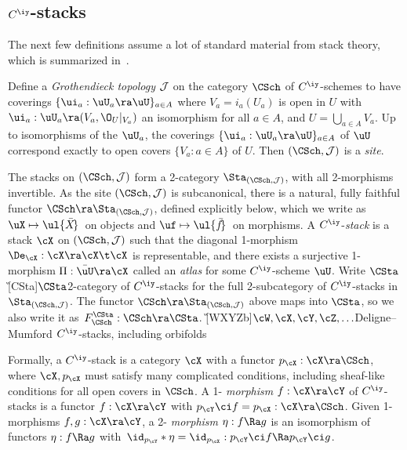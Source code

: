 \documentclass{article}
\begin{document}
\subsection{$C^\iy$-stacks}
\label{ds81}

The next few definitions assume a lot of standard material from
stack theory, which is summarized in~\cite[\S 7]{Joyc4}.

\begin{dfn} Define a {\it Grothendieck topology\/} $\cal J$ on the category $\CSch$ of $C^\iy$-schemes to
have coverings $\{\ui_a:\uU_a\ra\uU\}_{a\in A}$ where $V_a=i_a(U_a)$
is open in $U$ with $\ui_a:\uU_a\ra(V_a,\O_U\vert_{V_a})$ an
isomorphism for all $a\in A$, and $U=\bigcup_{a\in A}V_a$. Up to
isomorphisms of the $\uU_a$, the coverings
$\{\ui_a:\uU_a\ra\uU\}_{a\in A}$ of $\uU$ correspond exactly to open
covers $\{V_a:a\in A\}$ of $U$. Then $(\CSch,{\cal J})$ is a {\it
site}.

The stacks on $(\CSch,{\cal J})$ form a 2-category
$\Sta_{(\CSch,{\cal J})}$, with all 2-morphisms invertible. As the
site $(\CSch,{\cal J})$ is subcanonical, there is a natural, fully
faithful functor $\CSch\ra
\Sta_{(\CSch,{\cal J})}$, defined explicitly below, which we write
as $\uX\mapsto\ul{\bar X\!}\,$ on objects and $\uf\mapsto\ul{\bar
f\!}\,$ on morphisms. A $C^\iy$-{\it stack\/} is a stack $\cX$ on
$(\CSch,{\cal J})$ such that the diagonal 1-morphism
$\De_\cX:\cX\ra\cX\t\cX$ is representable, and there exists a
surjective 1-morphism $\Pi:\bar\uU\ra\cX$ called an {\it
atlas\/} for some $C^\iy$-scheme $\uU$. Write
$\CSta$\G[CSta]{$\CSta$}{2-category of $C^\iy$-stacks} for the full
2-subcategory of $C^\iy$-stacks in $\Sta_{(\CSch,{\cal J})}$. The
functor $\CSch\ra \Sta_{(\CSch,{\cal J})}$ above maps into $\CSta$,
so we also write it as~$F_\CSch^\CSta:\CSch\ra\CSta$.
\G[WXYZb]{$\cW,\cX,\cY,\cZ,\ldots$}{Deligne--Mumford $C^\iy$-stacks,
including orbifolds}

Formally, a $C^\iy$-stack is a category $\cX$ with a functor
$p_\cX:\cX\ra\CSch$, where $\cX,p_\cX$ must satisfy many complicated
conditions, including sheaf-like conditions for all open covers in
$\CSch$. A 1-{\it
morphism\/}
$f:\cX\ra\cY$ of $C^\iy$-stacks is a functor
$f:\cX\ra\cY$ with $p_\cY\ci f=p_\cX:\cX\ra\CSch$. Given 1-morphisms
$f,g:\cX\ra\cY$, a 2-{\it
morphism\/}
$\eta:f\Ra g$ is an isomorphism of
functors $\eta:f\Ra g$
with~$\id_{\smash{p_\cY}}
*\eta=\id_{\smash{p_\cX}}:p_\cY\ci f\Ra p_\cY\ci g$.


\end{dfn}
\end{document}
